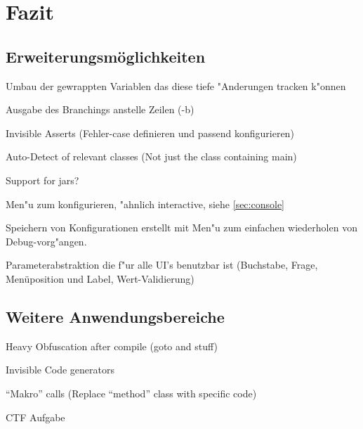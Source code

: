 
\chapter{Fazit}



\section{Erweiterungsmöglichkeiten} 

Umbau der gewrappten Variablen das diese tiefe "Anderungen tracken k"onnen

Ausgabe des Branchings anstelle Zeilen (-b)

Invisible Asserts (Fehler-case definieren und passend konfigurieren)

Auto-Detect of relevant classes (Not just the class containing main)

Support for jars?

Men"u zum konfigurieren, "ahnlich interactive, siehe \ref{sec:console}

Speichern von Konfigurationen erstellt mit Men"u zum einfachen wiederholen von Debug-vorg"angen.

Parameterabstraktion die f"ur alle UI's benutzbar ist (Buchstabe, Frage, Menüposition und Label, Wert-Validierung)

\section{Weitere Anwendungsbereiche} 

Heavy Obfuscation after compile (goto and stuff)

Invisible Code generators

"`Makro"' calls (Replace "`method"' class with specific code)

CTF Aufgabe